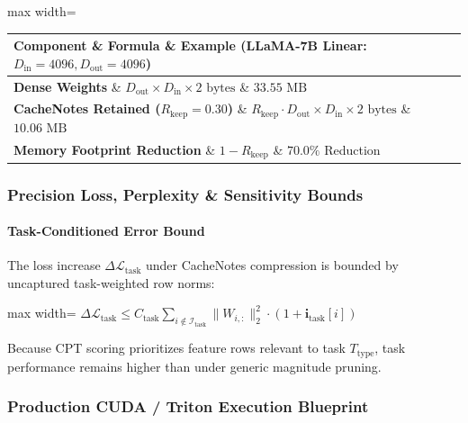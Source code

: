 \begin{center}
\begin{adjustbox}{max width=\columnwidth}
\renewcommand{\arraystretch}{1.2}
\begin{tabular}{lll}
\toprule
Component \& Formula \& Example (LLaMA-7B Linear: $D_{\text{in}}=4096, D_{\text{out}}=4096$) \\
\midrule
\textbf{Dense Weights} \& $D_{\text{out}} \times D_{\text{in}} \times 2 \text{ bytes}$ \& $33.55 \text{ MB}$ \\
\textbf{CacheNotes Retained ($R_{\text{keep}}=0.30$)} \& $R_{\text{keep}} \cdot D_{\text{out}} \times D_{\text{in}} \times 2 \text{ bytes}$ \& $10.06 \text{ MB}$ \\
\textbf{Memory Footprint Reduction} \& $1 - R_{\text{keep}}$ \& $\mathbf{70.0\%}$ Reduction \\

\bottomrule
\end{tabular}
\end{adjustbox}
\end{center}

\subsubsection*{Precision Loss, Perplexity \& Sensitivity Bounds}

\paragraph{Task-Conditioned Error Bound}

The loss increase $\Delta \mathcal{L}_{\text{task}}$ under CacheNotes compression is bounded by uncaptured task-weighted row norms:

\begin{center}
\begin{adjustbox}{max width=\columnwidth}
$\displaystyle
\Delta \mathcal{L}_{\text{task}} \le C_{\text{task}} \sum_{i \notin \mathcal{I}_{\text{task}}} \| W_{i, :} \|_2^2 \cdot (1 + \mathbf{i}_{\text{task}}[i])
$
\end{adjustbox}
\end{center}

Because CPT scoring prioritizes feature rows relevant to task $T_{\text{type}}$, task performance remains higher than under generic magnitude pruning.


\subsubsection*{Production CUDA / Triton Execution Blueprint}

